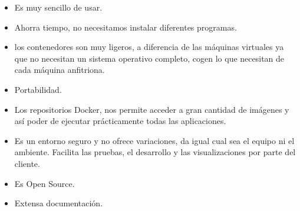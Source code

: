 \begin{itemize}
\item Es muy sencillo de usar.
\item Ahorra tiempo, no necesitamos instalar diferentes programas.
\item los contenedores son muy ligeros, a diferencia de las máquinas virtuales ya que no necesitan un sistema operativo completo, cogen lo que necesitan de cada máquina anfitriona.
\item Portabilidad.
\item Los repositorios Docker, nos permite acceder a gran cantidad de imágenes y así poder de ejecutar prácticamente todas las aplicaciones.
\item Es un entorno seguro y no ofrece variaciones, da igual cual sea el equipo ni el ambiente. Facilita las pruebas, el desarrollo y las visualizaciones por parte del cliente.
\item Es Open Source.
\item Extensa documentación.
\end{itemize}
